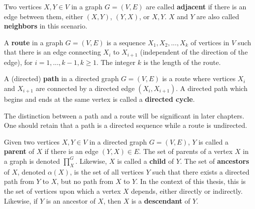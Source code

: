\begin{definition} Two vertices $X, Y \in V$ in a graph $G = (V,E)$ are called \textbf{adjacent} if there is an edge between them, either $(X,Y)$, $(Y,X)$, or ${X,Y}$. $X$ and $Y$ are also called \textbf{neighbors} in this scenario. 
\end{definition}

\begin{definition}[Route]
A \textbf{route} in a graph $G = (V,E)$ is a sequence $X_{1}, X_{2}, ..., X_{k}$ of vertices in $V$ such that there is an edge connecting $X_{i}$ to $X_{i+1}$ (independent of the direction of the edge), for $i = 1, ..., k-1, k \geq 1$. The integer $k$ is the length of the route.
\end{definition}

\begin{definition}\label{def:directedcycle}
A (directed) \textbf{path} in a directed graph $G=(V,E)$ is a route where vertices $X_{i}$ and $X_{i+1}$ are connected by a directed edge $(X_{i},X_{i+1})$. A directed path which begins and ends at the same vertex is called a \textbf{directed cycle}. 
\end{definition}

\begin{remark}
The distinction between a path and a route will be significant in later chapters. One should retain that a path is a directed sequence while a route is undirected. 
\end{remark}

\begin{definition}
Given two vertices $X,Y \in V$ in a directed graph $G = (V,E)$, $Y$ is called a \textbf{parent} of $X$ if there is an edge $(Y,X) \in E$. The set of parents of a vertex $X$ in a graph is denoted $\prod\nolimits_{X}^{G}$. Likewise, $X$ is called a \textbf{child} of $Y$. The set of \textbf{ancestors} of $X$, denoted $\alpha(X)$, is the set of all vertices $Y$ such that there exists a directed path from $Y$ to $X$, but no path from $X$ to $Y$. In the context of this thesis, this is the set of vertices upon which a vertex $X$ depends, either directly or indirectly. Likewise, if $Y$ is an ancestor of $X$, then $X$ is a \textbf{descendant} of $Y$.
\end{definition}

